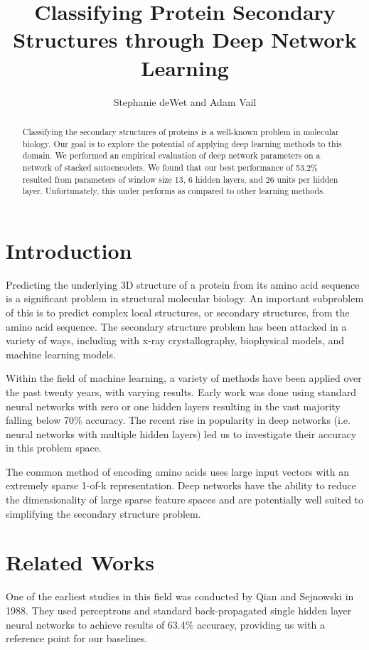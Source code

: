 \documentclass[letterpaper,twocolumn,12pt]{article}
\title{Classifying Protein Secondary Structures through Deep Network Learning}
\author{Stephanie deWet and Adam Vail}
\begin{document}
\maketitle

\begin{abstract}
Classifying the secondary structures of proteins is a well-known problem in molecular biology.
Our goal is to explore the potential of applying deep learning methods to this domain.
We performed an empirical evaluation of deep network parameters on a network of stacked autoencoders.
We found that our best performance of 53.2\% resulted from parameters of window size 13, 6 hidden layers, and 26 units per hidden layer.
Unfortunately, this under performs as compared to other learning methods.
\end{abstract}

\section{Introduction}
\label{subsec:intro}
Predicting the underlying 3D structure of a protein from its amino acid sequence is a significant problem in structural molecular biology.
An important subproblem of this is to predict complex local structures, or secondary structures, from the amino acid sequence.  
The secondary structure problem has been attacked in a variety of ways, including with x-ray crystallography, biophysical models, and machine learning models.

Within the field of machine learning, a variety of methods have been applied over the past twenty years, with varying results. 
Early work was done using standard neural networks with zero or one hidden layers resulting in the vast majority falling below 70\% accuracy.
The recent rise in popularity in deep networks (i.e. neural networks with multiple hidden layers) led us to investigate their accuracy in this problem space.

The common method of encoding amino acids uses large input vectors with an extremely sparse 1-of-k representation.
Deep networks have the ability to reduce the dimensionality of large sparse feature spaces and are potentially well suited to simplifying the secondary structure problem.

\section{Related Works}
\label{subsec:relatedworks}
One of the earliest studies in this field was conducted by Qian and Sejnowski \cite{Qian} in 1988.
They used perceptrons and standard back-propagated single hidden layer neural networks to achieve results of 63.4\% accuracy, providing us with a reference point for our baselines.
\end{document}
